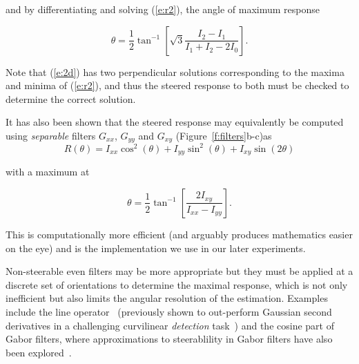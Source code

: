 \documentclass[10pt,twocolumn,letterpaper]{article}
\newcommand{\fref}[1]{Figure~\ref{#1}}
\newcommand{\eref}[1]{(\ref{#1})}
\def\Gx{G_x}
\def\Gy{G_y}
\def\Gxx{G_{xx}}
\def\Gxy{G_{xy}} \def\Gyx{G_{yx}}
\def\Gyy{G_{yy}}
\def\Ixx{I_{xx}}
\def\Ixy{I_{xy}}
\def\Iyy{I_{yy}}
\newcommand{\comment}[1]{}
\begin{document}
\noindent and by differentiating and solving \eref{e:r2}, the angle of maximum response

\begin{equation}
\theta = \frac{1}{2}\tan^{-1}\left[ \sqrt{3} \frac{I_2 - I_1}{I_1 + I_2 - 2I_0} \right].
\label{e:2d}
\end{equation}

Note that \eref{e:2d} has two perpendicular solutions corresponding to the maxima and minima of \eref{e:r2}, and thus the steered response to both must be checked to determine the correct solution.

It has also been shown that the steered response may equivalently be computed using \emph{separable} filters $\Gxx$, $\Gyy$ and $\Gxy$ (\fref{f:filters}b-c)as
\begin{equation}
R(\theta) = \Ixx \cos^2(\theta) + \Iyy \sin^2(\theta) + \Ixy \sin(2\theta)
\label{e:r2s}
\end{equation}
\comment{this can also be derived from the Hessian matrix equation}

\noindent with a maximum at

\begin{equation}
\theta = \frac{1}{2}\tan^{-1}\left[ \frac{2\Ixy}{\Ixx-\Iyy} \right].
\label{e:2ds}
\end{equation}

This is computationally more efficient (and arguably produces mathematics easier on the eye) and is the implementation we use in our later experiments.

\comment{I think we can remove this paragraph - it's not so relevant any more.}

Non-steerable even filters may be more appropriate but they must be applied at a discrete set of orientations to determine the maximal response, which is not only inefficient but also limits the angular resolution of the estimation. Examples include the line operator~\cite{Dixon_Taylor_IPC79} (previously shown to out-perform Gaussian second derivatives in a challenging curvilinear \emph{detection} task~\cite{Zwiggelaar_etal_TMI04}) and the cosine part of Gabor filters, where approximations to steerablility in Gabor filters have also been explored~\cite{Teo_1987,Perona_PAMI95}.
\end{document}
